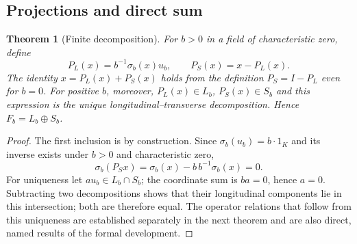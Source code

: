 \documentclass[11pt,reqno]{amsart}
\newtheorem{theorem}{Theorem}[section]
\theoremstyle{definition}\newtheorem{definition}[theorem]{Definition}
\theoremstyle{remark}\newtheorem{remark}[theorem]{Remark}
\begin{document}
\subsection{Projections and direct sum}\label{main:sub-24}
\begin{theorem}[Finite decomposition]\label{thm:directsum}
For $b>0$ in a field of characteristic zero, define
\[
P_L(x)=b^{-1}\sigma_b(x)u_b,\qquad P_S(x)=x-P_L(x).
\]
The identity $x=P_L(x)+P_S(x)$ holds from the definition $P_S=I-P_L$ even for $b=0$. For positive $b$, moreover, $P_L(x)\in L_b$, $P_S(x)\in S_b$ and this expression is the unique longitudinal--transverse decomposition. Hence $F_b=L_b\oplus S_b$.
\end{theorem}
\begin{proof}
The first inclusion is by construction. Since $\sigma_b(u_b)=b\cdot1_K$ and its inverse exists under $b>0$ and characteristic zero,
\[
\sigma_b(P_Sx)=\sigma_b(x)-b\,b^{-1}\sigma_b(x)=0.
\]
For uniqueness let $au_b\in L_b\cap S_b$; the coordinate sum is $ba=0$, hence $a=0$. Subtracting two decompositions shows that their longitudinal components lie in this intersection; both are therefore equal. The operator relations that follow from this uniqueness are established separately in the next theorem and are also direct, named results of the formal development.
\end{proof}
\end{document}
